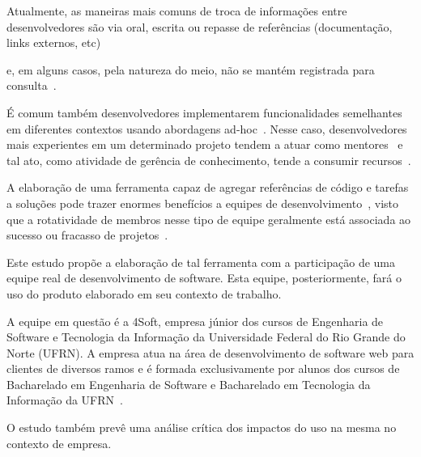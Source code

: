 Atualmente, as maneiras mais comuns de troca de informações entre desenvolvedores são via oral, escrita ou repasse de referências (documentação, links externos, etc)~\cite{Storey2014}~\cite{Olson2000}~\cite{CubraniC2004} e, em alguns casos, pela natureza do meio, não se mantém registrada para consulta~\cite{Olson2000}.


É comum também desenvolvedores implementarem funcionalidades semelhantes em diferentes contextos usando abordagens ad-hoc~\cite{SangMok2011}. Nesse caso, desenvolvedores mais experientes em um determinado projeto tendem a atuar como mentores~\cite{CubraniC2004} e tal ato, como atividade de gerência de conhecimento, tende a consumir recursos~\cite{Wiig2003}.


A elaboração de uma ferramenta capaz de agregar referências de código e tarefas a soluções pode trazer enormes benefícios a equipes de desenvolvimento~\cite{CubraniC2004}, visto que a rotatividade de membros nesse tipo de equipe geralmente está associada ao sucesso ou fracasso de projetos~\cite{Hall2008}. 

Este estudo propõe a elaboração de tal ferramenta com a participação de uma equipe real de desenvolvimento de software. Esta equipe, posteriormente, fará o uso do produto elaborado em seu contexto de trabalho.

A equipe em questão é a 4Soft, empresa júnior dos cursos de Engenharia de Software e Tecnologia da Informação da Universidade Federal do Rio Grande do Norte (UFRN). A empresa atua na área de desenvolvimento de software web para clientes de diversos ramos e é formada exclusivamente por alunos dos cursos de Bacharelado em Engenharia de Software e Bacharelado em Tecnologia da Informação da UFRN~\cite{4Soft}.

O estudo também prevê uma análise crítica dos impactos do uso na mesma no contexto de empresa.





